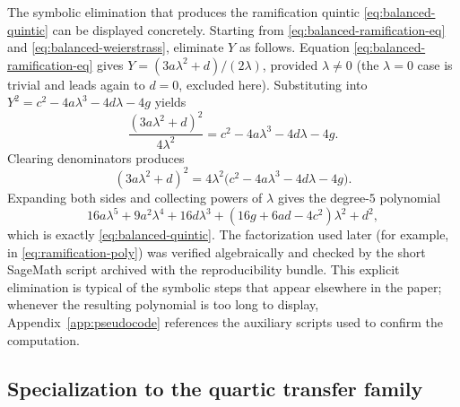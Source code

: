 The symbolic elimination that produces the ramification quintic \eqref{eq:balanced-quintic} can be displayed concretely.
Starting from \eqref{eq:balanced-ramification-eq} and \eqref{eq:balanced-weierstrass}, eliminate $Y$ as follows.
Equation \eqref{eq:balanced-ramification-eq} gives $Y=(3a\lambda^2+d)/(2\lambda)$, provided $\lambda\neq 0$ (the $\lambda=0$ case is trivial and leads again to $d=0$, excluded here).
Substituting into $Y^2=c^2-4a\lambda^3-4d\lambda-4g$ yields
\[
\frac{(3a\lambda^2+d)^2}{4\lambda^2}=c^2-4a\lambda^3-4d\lambda-4g.
\]
Clearing denominators produces
\[
(3a\lambda^2+d)^2=4\lambda^2\bigl(c^2-4a\lambda^3-4d\lambda-4g\bigr).
\]
Expanding both sides and collecting powers of $\lambda$ gives the degree-$5$ polynomial
\[
16a\lambda^5+9a^2\lambda^4+16d\lambda^3+(16g+6ad-4c^2)\lambda^2+d^2,
\]
which is exactly \eqref{eq:balanced-quintic}.
The factorization used later (for example, in \eqref{eq:ramification-poly}) was verified algebraically and checked by the short SageMath script archived with the reproducibility bundle.
This explicit elimination is typical of the symbolic steps that appear elsewhere in the paper; whenever the resulting polynomial is too long to display, Appendix~\ref{app:pseudocode} references the auxiliary scripts used to confirm the computation.

\subsection{Specialization to the quartic transfer family}

